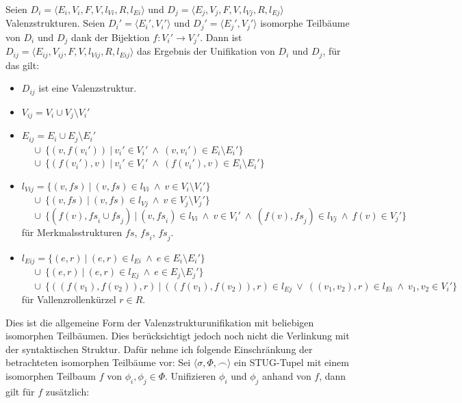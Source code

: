 \begin{definition}[Valenzstrukturunifikation]
Seien $D_i = \langle E_i,V_i,F,V,l_{V\!i},R,l_{Ei} \rangle$ und $D_j = \langle E_j,V_j,F,V,l_{V\!j},R,l_{Ej} \rangle$ Valenzstrukturen. Seien $D_i' = \langle E_i', V_i' \rangle$ und $D_j' = \langle E_j', V_j' \rangle$ isomorphe Teilbäume von $D_i$ und $D_j$ dank der Bijektion $f:V_i' \to V_j'$.  Dann ist $D_{ij} = \langle E_{ij},V_{ij},F,V,l_{Vij},R,l_{Eij} \rangle$ das Ergebnis der Unifikation von $D_i$ und $D_j$, für das gilt:
\begin{itemize}
  \item $D_{ij}$ ist eine Valenzstruktur.
  \item $V_{ij} = V_i \cup V_j \setminus V_i'$
  \item $E_{ij} = E_i \cup E_j \setminus E_i' $\\
                 $~~~~~ \cup \ \{ (v, f(v_i')) \ | \ v_i' \in V_i' \ \wedge \ (v,v_i') \in E_i \setminus E_i' \}$ \\
                 $~~~~~ \cup \ \{ (f(v_i'),v) \ | \ v_i' \in V_i' \ \wedge \ (f(v_i'),v) \in E_i \setminus E_i'  \}$
  \item $l_{Vij} =  \{ (v,\mathit{fs}) \ | \ (v,\mathit{fs}) \in l_{Vi} \ \wedge \ v \in V_i \setminus V_i' \} $ \\
                 $~~~~~ \cup \ \{ (v,\mathit{fs}) \ | \ (v,\mathit{fs}) \in l_{Vj} \ \wedge \ v \in V_j \setminus V_j' \} $ \\
                 $~~~~~ \cup \ \{ (f(v),\mathit{fs}_i \cup \mathit{fs}_j) \ | \ (v,\mathit{fs}_i) \in l_{Vi} \ \wedge \ v \in V_i' \ \wedge \ (f(v),\mathit{fs}_j) \in l_{Vj} \ \wedge \ f(v) \in V_j' \} $ \\
                 für Merkmalsstrukturen $\mathit{fs}$, $\mathit{fs}_i$, $\mathit{fs}_j$.
  \item $l_{Eij} = \{ (e,r) \ | \ (e,r) \in l_{Ei} \ \wedge \ e \in E_i \setminus E_i' \} $ \\
                 $~~~~~ \cup \ \{ (e,r) \ | \ (e,r) \in l_{Ej} \ \wedge \ e \in E_j \setminus E_j' \} $ \\
                 $~~~~~ \cup \ \{ ((f(v_1),f(v_2)),r) \ | \  ((f(v_1),f(v_2)),r) \in l_{Ej} \ \vee \ ((v_1,v_2),r) \in l_{Ei} \ \wedge \  v_1,v_2 \in V_i'\} $ \\
                 für Vallenzrollenkürzel $r \in R$.                
\end{itemize}
\end{definition}
Dies ist die allgemeine Form der Valenzstrukturunifikation mit beliebigen isomorphen Teilbäumen. Dies berücksichtigt jedoch noch nicht die Verlinkung mit der syntaktischen Struktur. Dafür nehme ich folgende Einschränkung der betrachteten isomorphen Teilbäume vor: Sei $\langle \sigma, \Phi, \frown \rangle$ ein STUG-Tupel mit einem isomorphen Teilbaum $f$ von $\phi_i, \phi_j \in \Phi$. Unifizieren $\phi_i$ und $\phi_j$ anhand von $f$, dann gilt für $f$ zusätzlich:
